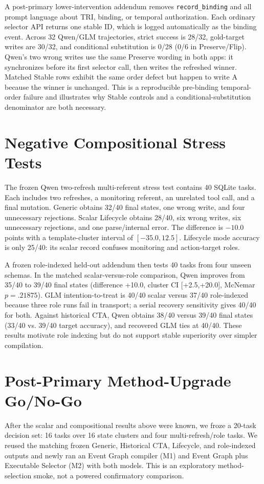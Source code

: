 \documentclass[10pt]{article}
\begin{document}
A post-primary lower-intervention addendum removes \texttt{record\_binding} and all prompt
language about TRI, binding, or temporal authorization. Each ordinary selector API returns one
stable ID, which is logged automatically as the binding event. Across 32 Qwen/GLM trajectories,
strict success is 28/32, gold-target writes are 30/32, and conditional substitution is 0/28 (0/6 in
Preserve/Flip). Qwen's two wrong writes use the same Preserve wording in both apps: it synchronizes
before its first selector call, then writes the refreshed winner. Matched Stable rows exhibit the
same order defect but happen to write A because the winner is unchanged. This is a reproducible
pre-binding temporal-order failure and illustrates why Stable controls and a conditional-substitution
denominator are both necessary.

\section{Negative Compositional Stress Tests}
The frozen Qwen two-refresh multi-referent stress test contains 40 SQLite tasks. Each includes two
refreshes, a monitoring referent, an unrelated tool call, and a final mutation. Generic obtains 32/40 final states,
one wrong write, and four unnecessary rejections. Scalar Lifecycle obtains 28/40, six wrong
writes, six unnecessary rejections, and one parse/internal error. The difference is $-10.0$
points with a template-cluster interval of $[-35.0,12.5]$. Lifecycle mode accuracy is only
25/40: its scalar record confuses monitoring and action-target roles.

A frozen role-indexed held-out addendum then tests 40 tasks from four unseen schemas. In the
matched scalar-versus-role comparison, Qwen improves from 35/40 to 39/40 final states
(difference +10.0, cluster CI [+2.5,+20.0], McNemar $p=.21875$). GLM intention-to-treat is
40/40 scalar versus 37/40 role-indexed because three role runs fail in transport; a serial
recovery sensitivity gives 40/40 for both. Against historical CTA, Qwen obtains 38/40 versus
39/40 final states (33/40 vs. 39/40 target accuracy), and recovered GLM ties at 40/40. These results
motivate role indexing but do not support stable superiority over simpler compilation.

\section{Post-Primary Method-Upgrade Go/No-Go}
After the scalar and compositional results above were known, we froze a 20-task decision set:
16 \NewSchemaReplication{} tasks over 16 state clusters and four multi-refresh/role tasks. We reused the
matching frozen Generic, Historical CTA, Lifecycle, and role-indexed outputs and newly ran an Event
Graph compiler (M1) and Event Graph plus Executable Selector (M2) with both models. This is an
exploratory method-selection smoke, not a powered confirmatory comparison.
\end{document}
